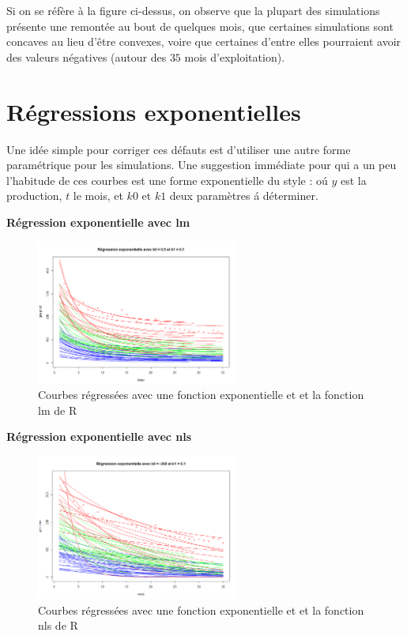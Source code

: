 \documentclass[12pt]{article}
\begin{document}
Si on se r\'ef\`ere \`a la figure ci-dessus, on observe que la plupart des simulations
pr\'esente une remont\'ee au bout de quelques mois, que certaines simulations sont concaves
au lieu d'\^etre convexes, voire que certaines d'entre elles pourraient avoir des valeurs n\'egatives (autour des $35$ mois d'exploitation).

\newpage


\section{R\'egressions exponentielles}

Une id\'ee simple pour corriger ces d\'efauts est d'utiliser une autre forme param\'etrique pour
les simulations. Une suggestion imm\'ediate pour qui a un peu l'habitude de ces courbes est
une forme exponentielle du style : o\'u $y$ est la production, $t$ le mois, et $k0$ et
$k1$ deux param\`etres \'a d\'eterminer.

\textbf{R\'egression exponentielle avec lm}

\begin{figure}[H]
 \centering %
	\includegraphics[width=250px]{reg_exp_1}
  \caption{\label{fig:exponential_reg_lm} Courbes r\'egress\'ees avec une fonction exponentielle et et la fonction lm de R}
\end{figure}


\textbf{R\'egression exponentielle avec nls}

\begin{figure}[H]
 \centering %
	\includegraphics[width=250px]{reg_exp_2}
  \caption{\label{fig:exponential_reg_nls} Courbes r\'egress\'ees avec une fonction exponentielle et et la fonction nls de R}
\end{figure}
\end{document}
